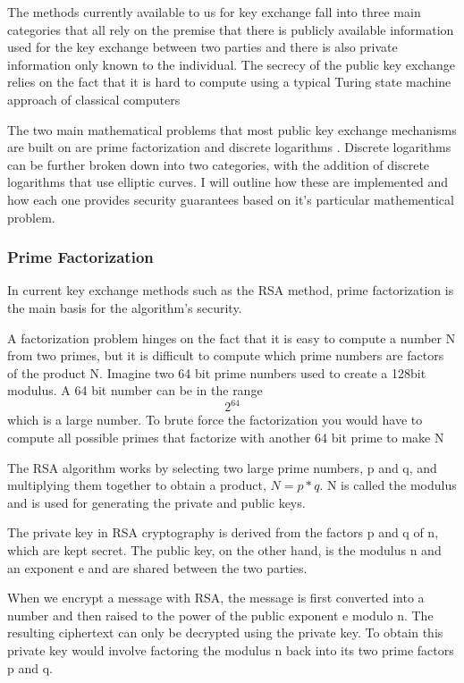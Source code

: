 \documentclass{article}
\begin{document}
The methods currently available to us for key exchange fall into three main categories that all rely on the premise that there is publicly available information used for the key exchange between two parties and there is also private information only known to the individual. The secrecy of the public key exchange relies on the fact  that it is hard to compute using a typical Turing state machine approach of classical computers 

The two main mathematical problems that most public key exchange mechanisms are built on are prime factorization and discrete logarithms \cite{AndersonR2020}. Discrete logarithms can be further broken down into two categories, with the addition of discrete logarithms that use elliptic curves. I will outline how these are implemented and how each one provides security guarantees based on it's particular mathementical problem.

\subsubsection{Prime Factorization}

In current key exchange methods such as the RSA method, prime factorization is the main basis for the algorithm's security. 

A factorization problem hinges on the fact that it is easy to compute a number N from two primes, but it is difficult to compute which prime numbers are factors of the product N. Imagine two 64 bit prime numbers used to create a 128bit modulus. A 64 bit number can be in the range \[2^{64}\] which is a large number. To brute force the factorization you would have to compute all possible primes that factorize with another 64 bit prime to make N

The RSA algorithm works by selecting two large prime numbers, p and q, and multiplying them together to obtain a product, $N = p*q$.  N is called the modulus and is used for generating the private and public keys. 

The private key in RSA cryptography is derived from the factors p and q of n, which are kept secret. The public key, on the other hand, is the modulus n and an exponent e and are shared between the two parties.

When we encrypt a message with RSA, the message is first converted into a number and then raised to the power of the public exponent e modulo n. The resulting ciphertext can only be decrypted using the private key. To obtain this private key would  involve factoring the modulus n back into its two prime factors p and q.
\end{document}
